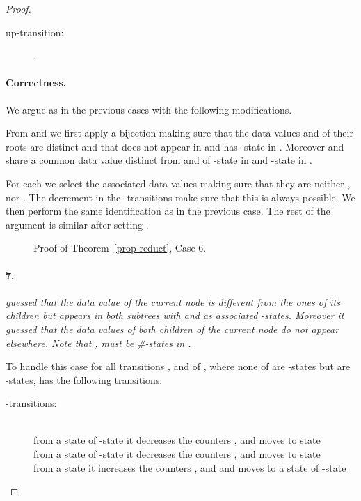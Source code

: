 \documentclass{CSML}
\begin{document}
\begin{proof}
\begin{description}
\item[\rm up-transition:]
.
\end{description}

\paragraph{\bf Correctness.}  
We argue as in the previous cases with the following modifications.

From  and  we first apply a bijection making sure that the
data values  and  of their roots are distinct and that  does not
appear in  and  has -state  in
. Moreover  and  share a common data value 
distinct from  and  of -state  in  and
-state  in .

For each  we select the associated data values making sure
that they are neither ,  nor . The decrement in the -transitions make sure
that this is always possible. We then perform the same identification as in the
previous case. 
The rest of the argument is similar after setting .

\begin{figure}
\small

\caption{Proof of Theorem~\ref{prop-reduct}, Case 6.}
\label{fig-reduct6}
\end{figure}









 
\paragraph{\bf 7.}  
\emph{ guessed that the data value  of the
  current node is different from the ones of its children but appears in both
  subtrees with  and  as associated -states. 
  Moreover it guessed that the data values of both children of the current node do not appear elsewhere.
  Note that ,  must be \#-states in .}

\noindent
To handle this case for all transitions 
,
 and 
 of , 
where none of  are -states but
 are -states,  has the following
transitions:
\begin{description}
\item[\rm -transitions:]\quad\\
from a state  of -state 
it decreases the counters ,  
and moves to state \\
from a state  of -state  
it decreases the counters ,  
and moves to state \\ 
from a state  
it increases the counters ,  and  
and moves to a state  of -state 


\end{description}
\end{proof}
\end{document}
